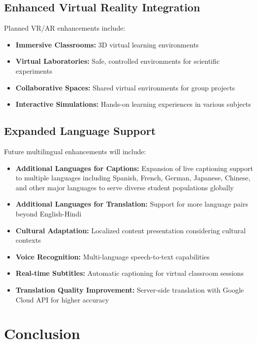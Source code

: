 \documentclass[onecolumn]{IEEEtran}
\begin{document}
\subsection{Enhanced Virtual Reality Integration}

Planned VR/AR enhancements include:

\begin{itemize}
\item \textbf{Immersive Classrooms:} 3D virtual learning environments
\item \textbf{Virtual Laboratories:} Safe, controlled environments for scientific experiments
\item \textbf{Collaborative Spaces:} Shared virtual environments for group projects
\item \textbf{Interactive Simulations:} Hands-on learning experiences in various subjects
\end{itemize}

\subsection{Expanded Language Support}

Future multilingual enhancements will include:

\begin{itemize}
\item \textbf{Additional Languages for Captions:} Expansion of live captioning support to multiple languages including Spanish, French, German, Japanese, Chinese, and other major languages to serve diverse student populations globally
\item \textbf{Additional Languages for Translation:} Support for more language pairs beyond English-Hindi
\item \textbf{Cultural Adaptation:} Localized content presentation considering cultural contexts
\item \textbf{Voice Recognition:} Multi-language speech-to-text capabilities
\item \textbf{Real-time Subtitles:} Automatic captioning for virtual classroom sessions
\item \textbf{Translation Quality Improvement:} Server-side translation with Google Cloud API for higher accuracy
\end{itemize}

\section{Conclusion}
\end{document}
